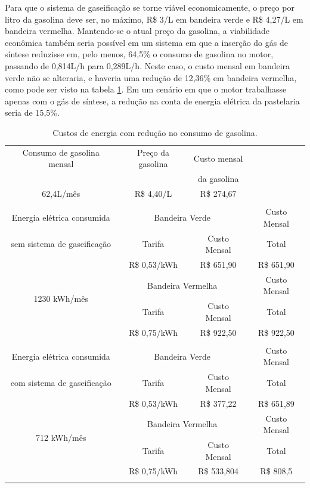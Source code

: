 Para que o sistema de gaseificação se torne viável economicamente, o preço por litro da gasolina deve ser, no máximo, R\$ 3/L em bandeira verde e R\$ 4,27/L em bandeira vermelha. Mantendo-se o atual preço da gasolina, a viabilidade econômica também seria possível em um sistema em que a inserção do gás de síntese reduzisse em, pelo menos, 64,5\% o consumo de gasolina no motor, passando de 0,814L/h para 0,289L/h. Neste caso, o custo mensal em bandeira verde não se alteraria, e haveria uma redução de 12,36\% em bandeira vermelha, como pode ser visto na tabela \ref{custos_reducao_gasolina}. Em um cenário em que o motor trabalhasse apenas com o gás de síntese, a redução na conta de energia elétrica da pastelaria seria de 15,5\%.

\begin{table}[h]
	\centering
	\caption{Custos de energia com redução no consumo de gasolina.}
	\begin{tabular}{|c|c|c|c|}
		\hline
		Consumo de gasolina mensal & Preço da gasolina & Custo mensal &\\
		& & da gasolina & \\
		62,4L/mês & R\$ 4,40/L & R\$ 274,67 &\\
		\hline
		\rowcolor{gray} \multicolumn{4}{|c|}{} \\
		\hline
		Energia elétrica consumida & \multicolumn{2}{c|}{Bandeira Verde} & Custo Mensal\\
		\cline{2-3}
		sem sistema de gaseificação & Tarifa & Custo Mensal & Total\\
		\multirow{4}{*}{1230 kWh/mês} & R\$ 0,53/kWh &  R\$ 651,90 & \cellcolor{lightgray} R\$ 651,90 \\
		\cline{2-4}
		& \multicolumn{2}{c|}{Bandeira Vermelha} & Custo Mensal\\
		\cline{2-3}
		& Tarifa  & Custo Mensal & Total\\
		& R\$ 0,75/kWh &  R\$ 922,50 & \cellcolor{lightgray} R\$ 922,50 \\
		\hline
		\rowcolor{gray} \multicolumn{4}{c}{} \\
		\hline
		Energia elétrica consumida & \multicolumn{2}{c|}{Bandeira Verde}  & Custo Mensal \\
		\cline{2-3}
		com sistema de gaseificação & Tarifa  & Custo Mensal & Total\\
		\multirow{4}{*}{712 kWh/mês} & R\$ 0,53/kWh & R\$ 377,22 & \cellcolor{lightgray} R\$ 651,89\\
		\cline{2-4}
		& \multicolumn{2}{c|}{Bandeira Vermelha} & Custo Mensal\\
		\cline{2-3}
		& Tarifa  & Custo Mensal &  Total \\
		& R\$ 0,75/kWh & R\$ 533,804 & \cellcolor{lightgray}R\$ 808,5\\
		\hline
		\rowcolor{gray} \multicolumn{4}{|c|}{} \\
		\hline
	\end{tabular}
	\label{custos_reducao_gasolina}
\end{table}	

